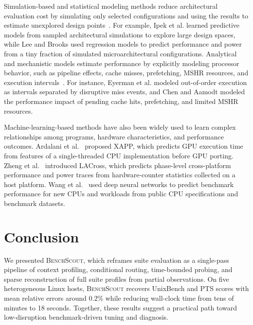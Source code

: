 \documentclass[sigplan,10pt]{acmart}
\newcommand{\ourmethod}{\textsc{BenchScout}\xspace}
\begin{document}
Simulation-based and statistical modeling methods reduce architectural evaluation cost by simulating only selected configurations and using the results to estimate unexplored design points~\cite{ipek2005approach,ipek2006efficiently,lee2006accurate,sharkawi2009performance}.
For example, Ipek et al.\cite{ipek2006efficiently} learned predictive models from sampled architectural simulations to explore large design spaces, while Lee and Brooks\cite{lee2006accurate} used regression models to predict performance and power from a tiny fraction of simulated microarchitectural configurations.
Analytical and mechanistic models estimate performance by explicitly modeling processor behavior, such as pipeline effects, cache misses, prefetching, MSHR resources, and execution intervals~\cite{hartstein2002optimum,eyerman2009mechanistic,chen2011hybrid,eyerman2011mechanistic,van2015micro}.
For instance, Eyerman et al.\cite{eyerman2009mechanistic} modeled out-of-order execution as intervals separated by disruptive miss events, and Chen and Aamodt\cite{chen2011hybrid} modeled the performance impact of pending cache hits, prefetching, and limited MSHR resources. 

Machine-learning-based methods have also been widely used to learn complex relationships among programs, hardware characteristics, and performance outcomes. 
Ardalani et al.~\cite{ardalani2015cross} proposed XAPP, which predicts GPU execution time from features of a single-threaded CPU implementation before GPU porting. 
Zheng et al.~\cite{zheng2016accurate} introduced LACross, which predicts phase-level cross-platform performance and power traces from hardware-counter statistics collected on a host platform. 
Wang et al.~\cite{wang2019predicting} used deep neural networks to predict benchmark performance for new CPUs and workloads from public CPU specifications and benchmark datasets. 

\section{Conclusion}

We presented \ourmethod{}, which reframes suite evaluation as a single-pass pipeline of context profiling, conditional routing, time-bounded probing, and sparse reconstruction of full suite profiles from partial observations.
On five heterogeneous Linux hosts, \ourmethod{} recovers UnixBench and PTS scores with mean relative errors around \(0.2\%\) while reducing wall-clock time from tens of minutes to 18 seconds.
Together, these results suggest a practical path toward low-disruption benchmark-driven tuning and diagnosis.
\end{document}
